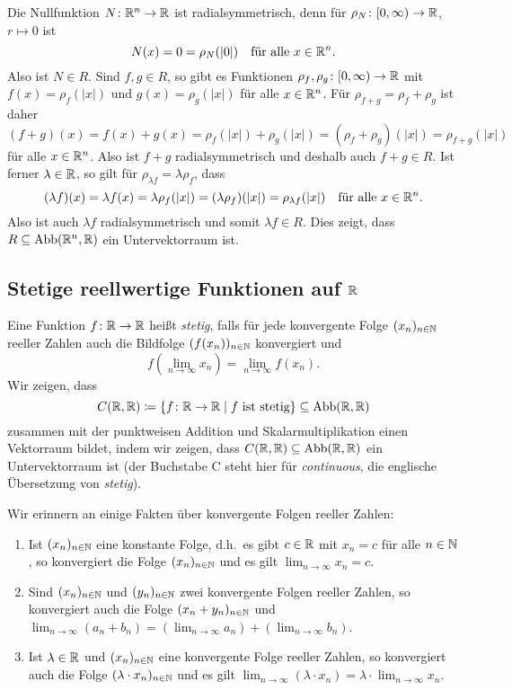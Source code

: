 Die Nullfunktion $N \colon \mathbb{R}^n \to \mathbb{R}$ ist radialsymmetrisch, denn für $\rho_N \colon [0,\infty) \to \mathbb{R}$, $r \mapsto 0$ ist
\[
 N(x) = 0 = \rho_N(|0|)
 \quad
 \text{für alle $x \in \mathbb{R}^n$}.
\]
Also ist $N \in R$. Sind $f,g \in R$, so gibt es Funktionen $\rho_f, \rho_g \colon [0,\infty) \to \mathbb{R}$ mit $f(x) = \rho_f(|x|)$ und $g(x) = \rho_g(|x|)$ für alle $x \in \mathbb{R}^n$. Für $\rho_{f+g} = \rho_f + \rho_g$ ist daher
\[
 (f+g)(x)
 = f(x) + g(x)
 = \rho_f(|x|) + \rho_g(|x|)
 = (\rho_f + \rho_g)(|x|)
 = \rho_{f+g}(|x|)
\]
für alle $x \in \mathbb{R}^n$. Also ist $f+g$ radialsymmetrisch und deshalb auch $f+g \in R$. Ist ferner $\lambda \in \mathbb{R}$, so gilt für $\rho_{\lambda f} = \lambda \rho_f$, dass
\[
 (\lambda f)(x)
 = \lambda f(x)
 = \lambda \rho_f(|x|)
 = (\lambda \rho_f)(|x|)
 = \rho_{\lambda f}(|x|)
 \quad
 \text{für alle $x \in \mathbb{R}^n$}.
\]
Also ist auch $\lambda f$ radialsymmetrisch und somit $\lambda f \in R$. Dies zeigt, dass \mbox{$R \subseteq \mathrm{Abb}(\mathbb{R}^n, \mathbb{R})$} ein Untervektorraum ist.



\subsection{Stetige reellwertige Funktionen auf \texorpdfstring{$\mathbb{R}$}{R}}
Eine Funktion $f \colon \mathbb{R} \to \mathbb{R}$ heißt \emph{stetig}, falls für jede konvergente Folge $(x_n)_{n \in \mathbb{N}}$ reeller Zahlen auch die Bildfolge $(f(x_n))_{n \in \mathbb{N}}$ konvergiert und
\[
 f\left( \lim_{n \to \infty} x_n \right)
 = \lim_{n \to \infty} f(x_n).
\]
Wir zeigen, dass
\[
 C(\mathbb{R},\mathbb{R})
 \coloneqq \{f \colon \mathbb{R} \to \mathbb{R} \mid \text{$f$ ist stetig}\}
 \subseteq \mathrm{Abb}(\mathbb{R}, \mathbb{R})
\]
zusammen mit der punktweisen Addition und Skalarmultiplikation einen Vektorraum bildet, indem wir zeigen, dass $C(\mathbb{R}, \mathbb{R}) \subseteq \mathrm{Abb}(\mathbb{R}, \mathbb{R})$ ein Untervektorraum ist (der Buchstabe C steht hier für \emph{continuous}, die englische Übersetzung von \emph{stetig}).


\begin{bem}
 Wir erinnern an einige Fakten über konvergente Folgen reeller Zahlen:
 \begin{enumerate}[label=\roman*)]
  \item
   Ist $(x_n)_{n \in \mathbb{N}}$ eine konstante Folge, d.h.\ es gibt $c \in \mathbb{R}$ mit $x_n = c$ für alle $n \in \mathbb{N}$, so konvergiert die Folge $(x_n)_{n \in \mathbb{N}}$ und es gilt $\lim_{n \to \infty} x_n = c$.
  \item
   Sind $(x_n)_{n \in \mathbb{N}}$ und $(y_n)_{n \in \mathbb{N}}$ zwei konvergente Folgen reeller Zahlen, so konvergiert auch die Folge $(x_n + y_n)_{n \in \mathbb{N}}$ und $\lim_{n \to \infty} (a_n+b_n) = (\lim_{n \to \infty} a_n) + (\lim_{n \to \infty} b_n)$.
  \item
   Ist $\lambda \in \mathbb{R}$ und $(x_n)_{n \in \mathbb{N}}$ eine konvergente Folge reeller Zahlen, so konvergiert auch die Folge $(\lambda \cdot x_n)_{n \in \mathbb{N}}$ und es gilt $\lim_{n \to \infty} (\lambda \cdot x_n) = \lambda \cdot \lim_{n \to \infty} x_n$.
 \end{enumerate}
\end{bem}


